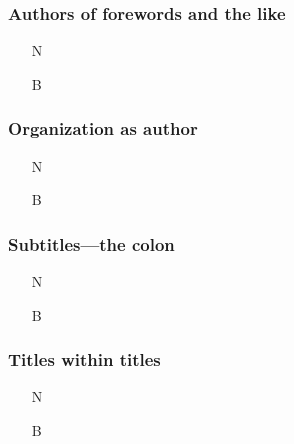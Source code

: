 \documentclass[11pt,letterpaper,oneside]{article}
\begin{document}
\setcounter{subsubsection}{90}
\subsubsection{Authors of forewords and the like}

\begin{itemize}
\item[N] 

\item[B] 
\end{itemize}

\subsubsection{Organization as author}


\begin{itemize}
\item[N] 

\item[B] 
\end{itemize}

\setcounter{subsubsection}{96}
\subsubsection{Subtitles---the colon}

\begin{itemize}
\item[N] 

\item[B] 
\end{itemize}


\setcounter{subsubsection}{101}
\subsubsection{Titles within titles}

\begin{itemize}
\item[N] 

\item[B] 
\end{itemize}
\end{document}
